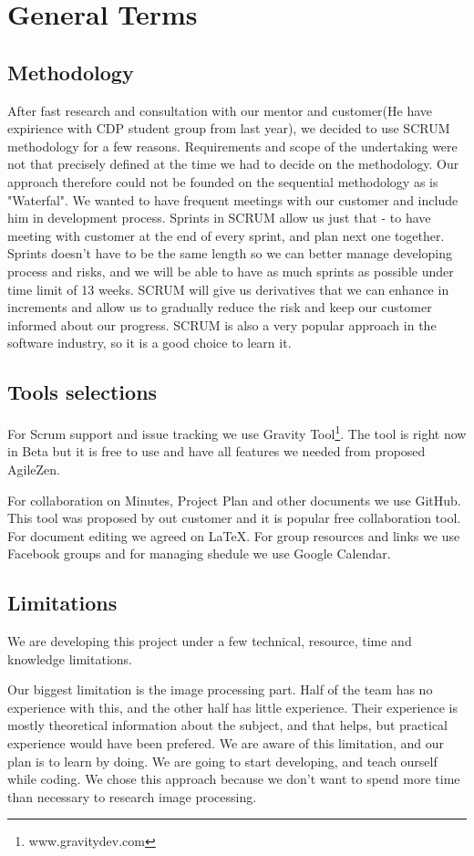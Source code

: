 \documentclass{article}
\begin{document}
\section{General Terms}
\subsection{Methodology}
After fast research and consultation with our mentor and customer(He have expirience with CDP student group from last year), we decided to use SCRUM methodology for a 
few reasons. Requirements and scope of the undertaking were not that precisely defined at the time 
we had to decide on the methodology. Our approach therefore could not be founded on the sequential methodology as is "Waterfal".
We wanted to have frequent meetings with our customer and include him in development process. Sprints in SCRUM allow us just that - 
to have meeting with customer at the end of every sprint, and plan next one together. Sprints doesn't have to be the same length so 
we can better manage developing process and risks, and we will be able to have as much sprints as possible under time limit of 13 weeks. 
SCRUM will give us derivatives that we can enhance in increments and allow us to gradually reduce the risk and keep our customer informed 
about our progress. SCRUM is also a very popular approach in the software industry, so it is a good choice to learn it. 


\subsection{Tools selections}
For Scrum support and issue tracking we use Gravity Tool\footnote{www.gravitydev.com}. 
The tool is right now in Beta but it is free to use and have all features we needed from proposed AgileZen.

For collaboration on Minutes, Project Plan and other documents we use GitHub. This tool was proposed by out customer and it is popular free collaboration tool.
For document editing we agreed on LaTeX.
For group resources and links we use Facebook groups and for managing shedule we use Google Calendar.
 
\subsection{Limitations}
We are developing this project under a few technical, resource, time and knowledge limitations. 

Our biggest limitation is the image processing part. Half of the team has no experience with this, and the other half has little experience. Their experience is mostly theoretical information about the subject, and that helps, but practical experience would have been prefered. We are aware of this limitation, and our plan is to learn by doing. We are going to start developing, and teach ourself while coding. We chose this approach because we don't want to spend more time than necessary to research image processing.   
\end{document}
